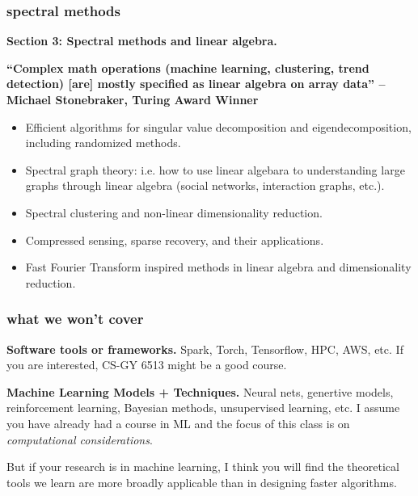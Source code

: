 \documentclass[]{beamer}
\begin{document}
	\begin{frame}
		\frametitle{spectral methods}
		\small
		
		\textbf{Section 3: Spectral methods and linear algebra.}
		
		\alert{\textbf{``Complex math operations (machine learning, clustering, trend detection) [are] mostly specified as linear algebra on array data'' -- Michael Stonebraker, Turing Award Winner}}
		
		\begin{itemize}
			\item Efficient algorithms for singular value decomposition and eigendecomposition, including randomized methods.
			\item Spectral graph theory: i.e. how to use linear algebara to understanding large graphs through linear algebra (social networks, interaction graphs, etc.). 
			\item Spectral clustering and non-linear dimensionality reduction.
			\item Compressed sensing, sparse recovery, and their applications.
			\item Fast Fourier Transform inspired methods in linear algebra and dimensionality reduction.
		\end{itemize}
	\end{frame}
	
	\begin{frame}
		\frametitle{what we won't cover}
		
		\textbf{Software tools or frameworks.} Spark, Torch, Tensorflow, HPC, AWS, etc.  If you are interested, CS-GY 6513 might be a good course.
		\vspace{1em}
		
		\textbf{Machine Learning Models + Techniques.} Neural nets, genertive models, reinforcement learning, Bayesian methods, unsupervised learning, etc. I assume you have already had a course in ML and the focus of this class is on \emph{computational considerations}.
		
		\begin{center}
			But if your research is in machine learning, I think you will find the theoretical tools we learn are more broadly applicable than in designing faster algorithms. 
		\end{center}
		
	\end{frame}
	
\end{document}
